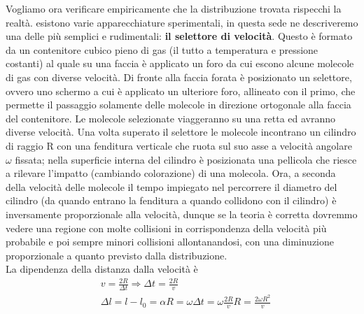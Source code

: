 \documentclass[10pt,a4paper]{article}
\begin{document}
Vogliamo ora verificare empiricamente che la distribuzione trovata rispecchi la realtà. esistono varie apparecchiature sperimentali, in questa sede ne descriveremo una delle più semplici e rudimentali: \textbf{il selettore di velocità}. Questo è formato da un contenitore cubico pieno di gas (il tutto a temperatura e pressione costanti) al quale su una faccia è applicato un foro da cui escono alcune molecole di gas con diverse velocità. Di fronte alla faccia forata è posizionato un selettore, ovvero uno schermo a cui è applicato un ulteriore foro, allineato con il primo, che permette il passaggio solamente delle molecole in direzione ortogonale alla faccia del contenitore. Le molecole selezionate viaggeranno su una retta ed avranno diverse velocità. Una volta superato il selettore le molecole incontrano un cilindro di raggio R con una fenditura verticale che ruota sul suo asse a velocità angolare $\omega$ fissata; nella superficie interna del cilindro è posizionata una pellicola che riesce a rilevare l'impatto (cambiando colorazione) di una molecola. Ora, a seconda della velocità delle molecole il tempo impiegato nel percorrere il diametro del cilindro (da quando entrano la fenditura a quando collidono con il cilindro) è inversamente proporzionale alla velocità, dunque se la teoria è corretta dovremmo vedere una regione con molte collisioni in corrispondenza della velocità più probabile e poi sempre minori collisioni allontanandosi, con una diminuzione proporzionale a quanto previsto dalla distribuzione.\\
La dipendenza della distanza dalla velocità è
\begin{align*}
	&v = \frac{2R}{\Delta t} \Rightarrow \Delta t = \frac{2R}{v}\\
	&\Delta l = l-l_0 = \alpha R = \omega \Delta t=\omega \frac{2R}{v}R = \frac{2 \omega R^2}{v} 
\end{align*}
\end{document}
